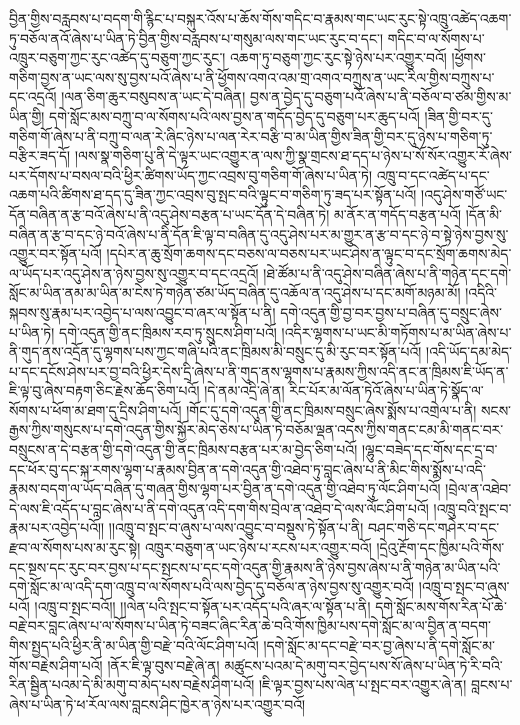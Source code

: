 བྱིན་གྱིས་བརླབས་པ་བདག་གི་རྙིང་པ་བསྐུར་འོས་པ་ཆོས་གོས་གདིང་བ་རྣམས་གང་ཡང་རུང་སྟེ་འཁྲུ་འཚེད་འཆག་ཏུ་བཅོལ་ནའོ་ཞེས་པ་ཡིན་ཏེ་བྱིན་གྱིས་བརླབས་པ་གསུམ་ལས་གང་ཡང་རུང་བ་དང་། གདིང་བ་ལ་སོགས་པ་འཁྲུར་བཅུག་ཀྱང་རུང་འཚེད་དུ་བཅུག་ཀྱང་རུང་། འཆག་ཏུ་བཅུག་ཀྱང་རུང་སྟེ་ཉེས་པར་འགྱུར་བའོ། །ཕྱོགས་གཅིག་བྱས་ན་ཡང་ལས་སུ་བྱས་པའོ་ཞེས་པ་ནི་ཕྱོགས་འགའ་འམ་གྲ་འགའ་བཀྲུས་ན་ཡང་རིལ་གྱིས་བཀྲུས་པ་དང་འདྲའོ། །ལན་ཅིག་ཆུར་བསུབས་ན་ཡང་དེ་བཞིན། བྱས་ན་བྱེད་དུ་བཅུག་པའོ་ཞེས་པ་ནི་བཅོལ་བ་ཙམ་གྱིས་མ་ཡིན་གྱི། དགེ་སློང་མས་བཀྲུ་བ་ལ་སོགས་པའི་ལས་བྱས་ན་གདོད་བྱེད་དུ་བཅུག་པར་ཆུད་པའོ། །ཟིན་གྱི་བར་དུ་གཅིག་གོ་ཞེས་པ་ནི་བཀྲུ་བ་ལན་རེ་ཞིང་ཉེས་པ་ལན་རེར་བརྩི་བ་མ་ཡིན་གྱིས་ཟིན་གྱི་བར་དུ་ཉེས་པ་གཅིག་ཏུ་བརྩིར་ཟད་དོ། །ལས་སྣ་གཅིག་པུ་ནི་དེ་ལྟར་ཡང་འགྱུར་ན་ལས་ཀྱི་སྣ་གྲངས་ཐ་དད་པ་ཉེས་པ་སོ་སོར་འགྱུར་རོ་ཞེས་པར་དོགས་པ་བསལ་བའི་ཕྱིར་ཚིགས་ཡོད་ཀྱང་འབྲས་བུ་གཅིག་གོ་ཞེས་པ་ཡིན་ཏེ། འཁྲུ་བ་དང་འཚེད་པ་དང་འཆག་པའི་ཚིགས་ཐ་དད་དུ་ཟིན་ཀྱང་འབྲས་བུ་སྤང་བའི་ལྟུང་བ་གཅིག་ཏུ་ཟད་པར་སྟོན་པའོ། །འདུ་ཤེས་གཙོ་ཡང་དོན་བཞིན་ན་རྩ་བའོ་ཞེས་པ་ནི་འདུ་ཤེས་བརྩན་པ་ཡང་དོན་དེ་བཞིན་ཏེ། མ་ནོར་ན་གདོད་བརྩན་པའོ། །དོན་མི་བཞིན་ན་རྩ་བ་དང་ཉེ་བའོ་ཞེས་པ་ནི་དོན་ཇི་ལྟ་བ་བཞིན་དུ་འདུ་ཤེས་པར་མ་གྱུར་ན་རྩ་བ་དང་ཉེ་བ་སྟེ་ཉེས་བྱས་སུ་འགྱུར་བར་སྟོན་པའོ། །དཔེར་ན་ཆུ་སྲོག་ཆགས་དང་བཅས་ལ་བཅས་པར་ཡང་ཤེས་ན་ལྟུང་བ་དང་སྲོག་ཆགས་མེད་ལ་ཡོད་པར་འདུ་ཤེས་ན་ཉེས་བྱས་སུ་འགྱུར་བ་དང་འདྲའོ། །ཐེ་ཚོམ་པ་ནི་འདུ་ཤེས་བཞིན་ཞེས་པ་ནི་གཉེན་དང་དགེ་སློང་མ་ཡིན་ནམ་མ་ཡིན་མ་ངེས་ཏེ་གཉེན་ཙམ་ཡོད་བཞིན་དུ་འཆོལ་ན་འདུ་ཤེས་པ་དང་མགོ་མཉམ་མོ། །འདིའི་སྐབས་སུ་རྣམ་པར་འབྱེད་པ་ལས་འབྱུང་བ་ཞར་ལ་སྟོན་པ་ནི། དགེ་འདུན་གྱི་བྱ་བར་བྱས་པ་བཞིན་དུ་བསྲུང་ཞེས་པ་ཡིན་ཏེ། དགེ་འདུན་གྱི་ནང་ཁྲིམས་རབ་ཏུ་སྲུངས་ཤིག་པའོ། །འདིར་ལྷགས་པ་ཡང་མི་གཏོགས་པ་མ་ཡིན་ཞེས་པ་ནི་གུད་ནས་འདྲོན་དུ་ལྷགས་པས་ཀྱང་གཞི་པའི་ནང་ཁྲིམས་མི་བསྲུང་དུ་མི་རུང་བར་སྟོན་པའོ། །འདི་ཡོད་དམ་མེད་པ་དང་དངོས་ཤེས་པར་བྱ་བའི་ཕྱིར་དེས་དྲི་ཞེས་པ་ནི་གུད་ནས་ལྷགས་པ་རྣམས་ཀྱིས་འདི་ནང་ན་ཁྲིམས་ཇི་ཡོད་ན་ཇི་ལྟ་བུ་ཞེས་བརྟག་ཅིང་རྗེས་ཆོད་ཅིག་པའོ། །དེ་ནམ་འདྲི་ཞེ་ན། རིང་པོར་མ་ལོན་ཏེའོ་ཞེས་པ་ཡིན་ཏེ་སྣོད་ལ་སོགས་པ་ཕོག་མ་ཐག་དུ་དྲིས་ཤིག་པའོ། །གོང་དུ་དགེ་འདུན་གྱི་ནང་ཁྲིམས་བསྲུང་ཞེས་སྨོས་པ་འགྲེལ་པ་ནི། སངས་རྒྱས་ཀྱིས་གསུངས་པ་དགེ་འདུན་གྱིས་སྐྱོར་མེད་ཅེས་པ་ཡིན་ཏེ་བཅོམ་ལྡན་འདས་ཀྱིས་གནང་ངམ་མི་གནང་བར་བསྲུངས་ན་དེ་བརྩན་གྱི་དགེ་འདུན་གྱི་ནང་ཁྲིམས་བརྩན་པར་མ་བྱེད་ཅིག་པའོ། །ལྷུང་བཟེད་དང་གོས་དང་དྲ་བ་དང་ཕོར་བུ་དང་སྐ་རགས་ལྷག་པ་རྣམས་བྱིན་ན་དགེ་འདུན་གྱི་འཐེབ་ཏུ་བླང་ཞེས་པ་ནི་མིང་གིས་སྨོས་པ་འདི་རྣམས་བདག་ལ་ཡོད་བཞིན་དུ་གཞན་གྱིས་ལྷག་པར་བྱིན་ན་དགེ་འདུན་གྱི་འཐེབ་ཏུ་ལོང་ཤིག་པའོ། །བྲེལ་ན་འཐེབ་དེ་ལས་ཇི་འདོད་པ་བླང་ཞེས་པ་ནི་དགེ་འདུན་འདི་དག་གིས་བྲེལ་ན་འཐེབ་དེ་ལས་ལོང་ཤིག་པའོ། །འཁྲུ་བའི་སྤང་བ་རྣམ་པར་འབྱེད་པའོ།། །།འཁྲུ་བ་སྤང་བ་ཞུས་པ་ལས་འབྱུང་བ་བསྡུས་ཏེ་སྟོན་པ་ནི། བཤང་གཅི་དང་གཤེར་བ་དང་རྫབ་ལ་སོགས་པས་མ་རུང་སྟེ། འཁྲུར་བཅུག་ན་ཡང་ཉེས་པ་རངས་པར་འགྱུར་བའོ། །དྲེའུ་རྔོག་དང་ཁྱིམ་པའི་གོས་དང་སྔས་དང་རུང་བར་བྱས་པ་དང་སྤངས་པ་དང་དགེ་འདུན་གྱི་རྣམས་ནི་ཉེས་བྱས་ཞེས་པ་ནི་གཉེན་མ་ཡིན་པའི་དགེ་སློང་མ་ལ་འདི་དག་འཁྲུ་བ་ལ་སོགས་པའི་ལས་བྱེད་དུ་བཅོལ་ན་ཉེས་བྱས་སུ་འགྱུར་བའོ། །འཁྲུ་བ་སྤང་བ་ཞུས་པའོ། །འཁྲུ་བ་སྤང་བའོ།། །།ལེན་པའི་སྤང་བ་སྟོན་པར་འདོད་པའི་ཞར་ལ་སྟོན་པ་ནི། དགེ་སློང་མས་གོས་རིན་པོ་ཆེ་བརྗེ་བར་བླང་ཞེས་པ་ལ་སོགས་པ་ཡིན་ཏེ་བཟང་ཞིང་རིན་ཆེ་བའི་གོས་ཁྱིམ་པས་དགེ་སློང་མ་ལ་བྱིན་ན་བདག་གིས་སྤྱད་པའི་ཕྱིར་ནི་མ་ཡིན་གྱི་བརྫེ་བའི་ལོང་ཤིག་པའོ། །དགེ་སློང་མ་དང་བརྫེ་བར་བྱ་ཞེས་པ་ནི་དགེ་སློང་མ་གོས་བརྗེས་ཤིག་པའོ། །ནོར་ཇི་ལྟ་བུས་བརྗེ་ཞེ་ན། མཚུངས་པའམ་དེ་མགུ་བར་བྱེད་པས་སོ་ཞེས་པ་ཡིན་ཏེ་རི་བའི་རིན་སྦྱིན་པའམ་དེ་མི་མགུ་བ་མེད་པས་བརྗེས་ཤིག་པའོ། །ཇི་ལྟར་བྱས་པས་ལེན་པ་སྤང་བར་འགྱུར་ཞེ་ན། བླངས་པ་ཞེས་པ་ཡིན་ཏེ་ཕ་རོལ་ལས་བླངས་ཤིང་ཁྱེར་ན་ཉེས་པར་འགྱུར་བའོ། 